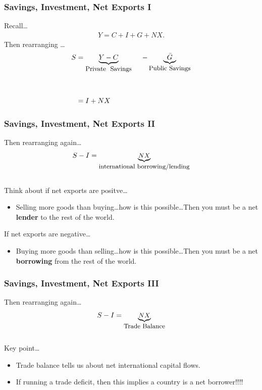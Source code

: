 \documentclass[handout]{beamer}
\begin{document}
\begin{frame}[t]
\frametitle{Savings, Investment, Net Exports I}
Recall\ldots
\begin{eqnarray*}
Y = C + I +  G + NX.
\end{eqnarray*}
Then rearranging \ldots
\begin{eqnarray*}
\small S &= \underbrace{Y - C}_{\small \mbox{Private \ Savings}} \ \ \ \ - \underbrace{\bar G}_{\small \mbox{Public\ Savings}} \\
\\
\\
&= I + NX
\end{eqnarray*}
\end{frame}


\begin{frame}[t]
\frametitle{Savings, Investment, Net Exports II}
Then rearranging again\ldots
\begin{eqnarray*}
\small S - I = \underbrace{NX}_{\small \mbox{international borrowing/lending}}
\end{eqnarray*}\\
\bigskip
Think about if net exports are positve\ldots
\begin{itemize}
\smallskip
\item Selling more goods than buying\ldots how is this possible\ldots Then you must be a net \textbf{lender} to the rest of the world.
\end{itemize}
\bigskip
If net exports are negative\ldots
\begin{itemize}
\smallskip
\item Buying more goods than selling\ldots how is this possible\ldots Then you must be a net \textbf{borrowing} from the rest of the world.
\end{itemize}
\end{frame}


\begin{frame}[t]
\frametitle{Savings, Investment, Net Exports III}
Then rearranging again\ldots
\begin{eqnarray*}
\small S - I = \underbrace{NX}_{\small \mbox{Trade Balance}}
\end{eqnarray*}\\
\bigskip
Key point\ldots
\begin{itemize}
\smallskip
\item Trade balance tells us about net international capital flows.
\medskip
\item If running a trade deficit, then this implies a country is a net borrower!!!!
\end{itemize}
\end{frame}
\end{document}
